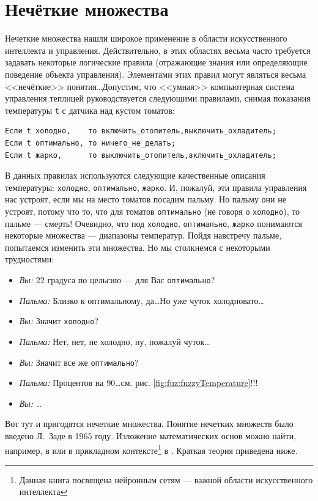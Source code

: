 \chapter{Нечёткие множества}

Нечеткие множества нашли широкое применение в области искусственного интеллекта и управления. Действительно, в этих областях весьма часто требуется задавать некоторые логические правила (отражающие знания или определяющие поведение объекта управления). Элементами этих правил могут являться весьма <<нечёткие>> понятия\ldots Допустим, что <<умная>> компьютерная система управления теплицей руководствуется следующими правилами, снимая показания температуры \verb"t" с датчика над кустом томатов:
\begin{verbatim}
Если t холодно,    то включить_отопитель,выключить_охладитель;
Если t оптимально, то ничего_не_делать;
Если t жарко,      то выключить_отопитель,включить_охладитель;
\end{verbatim}

В данных правилах используются следующие качественные описания температуры: \verb"холодно", \verb"оптимально", \verb"жарко". И, пожалуй, эти правила управления нас устроят, если мы на место томатов посадим пальму. Но пальму они не устроят, потому что то, что для томатов \verb"оптимально" (не говоря о \verb"холодно"), то пальме --- смерть! Очевидно, что под \verb"холодно", \verb"оптимально", \verb"жарко" понимаются некоторые множества --- диапазоны температур. Пойдя навстречу пальме, попытаемся изменить эти множества. Но мы столкнемся с некоторыми трудностями: 
\begin{itemize}
    \item[]\emph{Вы:} 22 градуса по цельсию --- для Вас \verb"оптимально"?
    \item[]\emph{Пальма:} Близко к оптимальному, да\ldots Но уже чуток холодновато\ldots 
    \item[]\emph{Вы:} Значит \verb"холодно"?
    \item[]\emph{Пальма:} Нет, нет, не холодно, ну, пожалуй чуток\ldots 
    \item[]\emph{Вы:} Значит все же \verb"оптимально"?
    \item[]\emph{Пальма:} Процентов на 90\ldots см. рис. \ref{fig:fuz:fuzzyTemperature}!!!
    \item[]\emph{Вы:} \ldots
\end{itemize}

Вот тут и пригодятся нечеткие множества. Понятие нечетких множеств было введено Л.~Заде в 1965 году. Изложение  математических основ можно найти, например, в \cite{bib:gorbatovs:discrmath} или в прикладном контексте\footnote{Данная книга посвящена нейронным сетям --- важной области искусственного интеллекта} в \cite{bib:osovsky:neyro}. Краткая теория приведена ниже.


